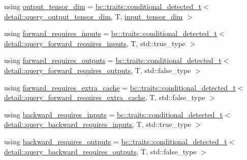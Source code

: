 \begin{DoxyCompactItemize}
\item 
using \hyperlink{structbc_1_1nn_1_1layer__traits_adee5a74fd6b7ae72f1bcfb483f2e3fd4}{output\+\_\+tensor\+\_\+dim} = \hyperlink{namespacebc_1_1traits_a1a6d378947ec32acd457890854bcd592}{bc\+::traits\+::conditional\+\_\+detected\+\_\+t}$<$ \hyperlink{namespacebc_1_1nn_1_1detail_aa16772b430fc14eb1bf4b82ad6f679fd}{detail\+::query\+\_\+output\+\_\+tensor\+\_\+dim}, T, \hyperlink{structbc_1_1nn_1_1layer__traits_ad59c13867670e4e117d657881bc2afe8}{input\+\_\+tensor\+\_\+dim} $>$
\item 
using \hyperlink{structbc_1_1nn_1_1layer__traits_acc45436e4f0539af616a07204eef707b}{forward\+\_\+requires\+\_\+inputs} = \hyperlink{namespacebc_1_1traits_a1a6d378947ec32acd457890854bcd592}{bc\+::traits\+::conditional\+\_\+detected\+\_\+t}$<$ \hyperlink{namespacebc_1_1nn_1_1detail_a93de41b72dd88c58d8f1d74276da87b3}{detail\+::query\+\_\+forward\+\_\+requires\+\_\+inputs}, T, std\+::true\+\_\+type $>$
\item 
using \hyperlink{structbc_1_1nn_1_1layer__traits_ace8ad3b761d12ad18a3b2982389b88d6}{forward\+\_\+requires\+\_\+outputs} = \hyperlink{namespacebc_1_1traits_a1a6d378947ec32acd457890854bcd592}{bc\+::traits\+::conditional\+\_\+detected\+\_\+t}$<$ \hyperlink{namespacebc_1_1nn_1_1detail_a10314a67405b06863c6384de87e36bad}{detail\+::query\+\_\+forward\+\_\+requires\+\_\+outputs}, T, std\+::false\+\_\+type $>$
\item 
using \hyperlink{structbc_1_1nn_1_1layer__traits_ab46948010fcdbbdf2270619d2644d4a8}{forward\+\_\+requires\+\_\+extra\+\_\+cache} = \hyperlink{namespacebc_1_1traits_a1a6d378947ec32acd457890854bcd592}{bc\+::traits\+::conditional\+\_\+detected\+\_\+t}$<$ \hyperlink{namespacebc_1_1nn_1_1detail_a51767bf55cf9cdf8cdff0f2929304390}{detail\+::query\+\_\+forward\+\_\+requires\+\_\+extra\+\_\+cache}, T, std\+::false\+\_\+type $>$
\item 
using \hyperlink{structbc_1_1nn_1_1layer__traits_af530493c93863e1f30a4f8c19fdcfceb}{backward\+\_\+requires\+\_\+inputs} = \hyperlink{namespacebc_1_1traits_a1a6d378947ec32acd457890854bcd592}{bc\+::traits\+::conditional\+\_\+detected\+\_\+t}$<$ \hyperlink{namespacebc_1_1nn_1_1detail_acb9ab0f627cee62dd68d673afc443608}{detail\+::query\+\_\+backward\+\_\+requires\+\_\+inputs}, T, std\+::true\+\_\+type $>$
\item 
using \hyperlink{structbc_1_1nn_1_1layer__traits_adb5ce9f80eb56e874462cf49a02bf2d4}{backward\+\_\+requires\+\_\+outputs} = \hyperlink{namespacebc_1_1traits_a1a6d378947ec32acd457890854bcd592}{bc\+::traits\+::conditional\+\_\+detected\+\_\+t}$<$ \hyperlink{namespacebc_1_1nn_1_1detail_ad187de638865a7fbfe0e3c1db1511e4a}{detail\+::query\+\_\+backward\+\_\+requires\+\_\+outputs}, T, std\+::false\+\_\+type $>$

\end{DoxyCompactItemize}
